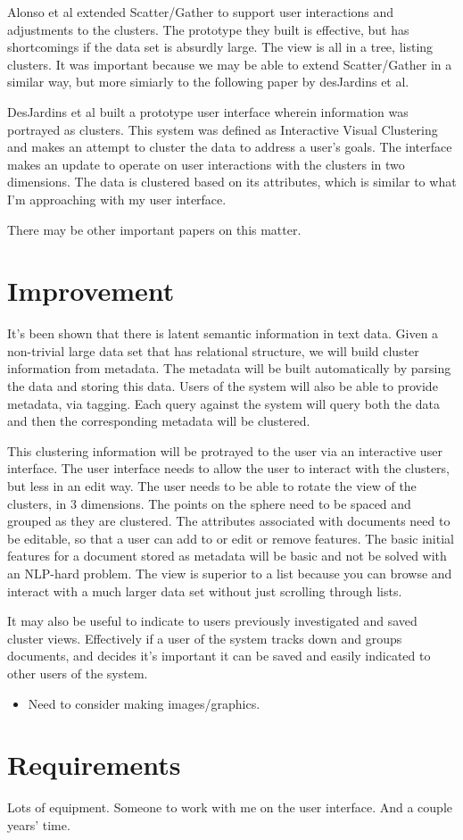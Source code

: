 \documentclass[11pt]{article}
\begin{document}
Alonso et al \cite{Alonso2008} extended Scatter/Gather to support user interactions and adjustments to the clusters.  The prototype they built is effective, but has shortcomings if the data set is absurdly large.  The view is all in a tree, listing clusters.  It was important because we may be able to extend Scatter/Gather in a similar way, but more simiarly to the following paper by desJardins et al.

DesJardins et al \cite{desJardins2007} built a prototype user interface wherein information was portrayed as clusters.  This system was defined as Interactive Visual Clustering and makes an attempt to cluster the data to address a user's goals.  The interface makes an update to operate on user interactions with the clusters in two dimensions.  The data is clustered based on its attributes, which is similar to what I'm approaching with my user interface.

There may be other important papers on this matter.

\section{Improvement}

It's been shown that there is latent semantic information in text data.  Given a non-trivial large data set that has relational structure, we will build cluster information from metadata.  The metadata will be built automatically by parsing the data and storing this data.  Users of the system will also be able to provide metadata, via tagging.  Each query against the system will query both the data and then the corresponding metadata will be clustered.

This clustering information will be protrayed to the user via an interactive user interface.  The user interface needs to allow the user to interact with the clusters, but less in an edit way.  The user needs to be able to rotate the view of the clusters, in 3 dimensions.  The points on the sphere need to be spaced and grouped as they are clustered.  The attributes associated with documents need to be editable, so that a user can add to or edit or remove features.  The basic initial features for a document stored as metadata will be basic and not be solved with an NLP-hard problem.  The view is superior to a list because you can browse and interact with a much larger data set without just scrolling through lists.

It may also be useful to indicate to users previously investigated and saved cluster views.  Effectively if a user of the system tracks down and groups documents, and decides it's important it can be saved and easily indicated to other users of the system.

\begin{itemize}
\item Need to consider making images/graphics.
\end{itemize}

\section{Requirements}

Lots of equipment.  Someone to work with me on the user interface.  And a couple years' time.



\end{document}
